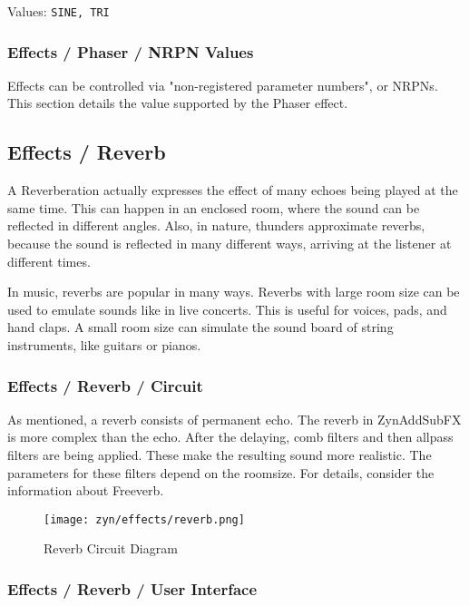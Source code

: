    Values: \texttt{SINE, TRI}

\subsubsection{Effects / Phaser / NRPN Values}
\label{subsubsec:effects_edit_phaser_nrpn}

Effects can be controlled via "non-registered parameter numbers", or NRPNs.
This section details the value supported by the Phaser effect.

\subsection{Effects / Reverb}
\label{subsec:effects_edit_reverb}

   A Reverberation actually expresses the effect of many echoes being played
   at the same time. This can happen in an enclosed room, where the sound can
   be reflected in different angles. Also, in nature, thunders approximate
   reverbs, because the sound is reflected in many different ways, arriving
   at the listener at different times.

   In music, reverbs are popular in many ways. Reverbs with large room size
   can be used to emulate sounds like in live concerts. This is useful for
   voices, pads, and hand claps. A small room size can simulate the sound
   board of string instruments, like guitars or pianos.

\subsubsection{Effects / Reverb / Circuit}
\label{subsubsec:effects_edit_reverb_circuit}

   As mentioned, a reverb consists of permanent echo. The reverb in
   ZynAddSubFX is more complex than the echo. After the delaying, comb
   filters and then allpass filters are being applied. These make the
   resulting sound more realistic. The parameters for these filters depend on
   the roomsize. For details, consider the information about Freeverb.

\begin{figure}[H]
   \centering
   \texttt{[image: zyn/effects/reverb.png]}
   \caption{Reverb Circuit Diagram}
   \label{fig:reverb_circuit_diagram}
\end{figure}

\subsubsection{Effects / Reverb / User Interface}
\label{subsubsec:effects_edit_reverb_ui}

